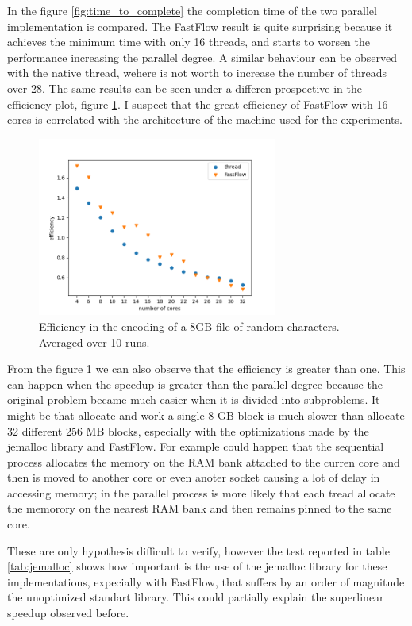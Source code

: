 \documentclass[12pt, letterpaper]{article}
\begin{document}
In the figure \ref{fig:time_to_complete} the completion time of the two parallel implementation is compared. The FastFlow result is quite surprising because it achieves the minimum time with only 16 threads, and starts to worsen the performance increasing the parallel degree. A similar behaviour can be observed with the native thread, wehere is not worth to increase the number of threads over 28. The same results can be seen under a differen prospective in the efficiency plot, figure \ref{fig:efficiency}. I suspect that the great efficiency of FastFlow with 16 cores is correlated with the architecture of the machine used for the experiments.


\begin{figure}
    \centering
    \includegraphics[width=0.7\textwidth]{./images/efficiency.png}
    \caption{Efficiency in the encoding of a 8GB file of random characters. Averaged over 10 runs.}
    \label{fig:efficiency}
\end{figure}

From the figure \ref{fig:efficiency} we can also observe that the efficiency is greater than one. This can happen when the speedup is greater than the parallel degree because the original problem became much easier when it is divided into subproblems. It might be that allocate and work a single 8 GB block is much slower than allocate 32 different 256 MB blocks, especially with the optimizations made by the jemalloc library and FastFlow. For example could happen that the sequential process allocates the memory on the RAM bank attached to the curren core and then is moved to another core or even anoter socket causing a lot of delay in accessing memory; in the parallel process is more likely that each tread allocate the memorory on the nearest RAM bank and then remains pinned to the same core.

These are only hypothesis difficult to verify, however the test reported in table \ref{tab:jemalloc} shows how important is the use of the jemalloc library for these implementations, expecially with FastFlow, that suffers by an order of magnitude the unoptimized standart library. This could partially explain the superlinear speedup observed before.
\end{document}
